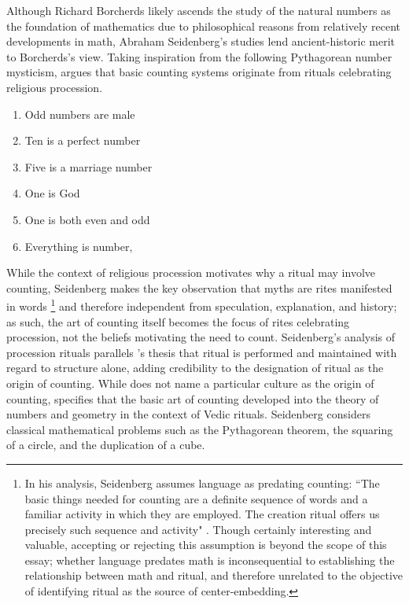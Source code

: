 \documentclass[12pt, letterpaper]{article}
\begin{document}
Although Richard Borcherds likely ascends the study of the natural numbers as the foundation of mathematics due to philosophical reasons from relatively recent developments in math, Abraham Seidenberg's studies lend ancient-historic merit to Borcherds's view. 
Taking inspiration from the following Pythagorean number mysticism, \cite{seidenberg1962counting} argues that basic counting systems originate from rituals celebrating religious procession. 
\begin{enumerate}
  \centering
  \item Odd numbers are male 
  \item Ten is a perfect number 
  \item Five is a marriage number 
  \item One is God 
  \item One is both even and odd 
  \item Everything is number,
\end{enumerate}
While the context of religious procession motivates why a ritual may involve counting, Seidenberg makes the key observation that myths are rites manifested in words
\footnote{In his analysis, Seidenberg assumes language as predating counting: 
``The basic things needed for counting are a definite sequence of words and a familiar activity in which they are employed. 
The creation ritual offers us precisely such sequence and activity" \parencite[p. 8]{seidenberg1962counting}.
Though certainly interesting and valuable, accepting or rejecting this assumption is beyond the scope of this essay; 
whether language predates math is inconsequential to establishing the relationship between math and ritual, and therefore unrelated to the objective of identifying ritual as the source of center-embedding.} \label{ft:lang_pred_math}
and therefore independent from speculation, explanation, and history;
as such, the art of counting itself becomes the focus of rites celebrating procession, not the beliefs motivating the need to count.
Seidenberg's analysis of procession rituals parallels \cite{staal1984search}'s thesis that ritual is performed and maintained with regard to structure alone, adding credibility to the designation of ritual as the origin of counting.  
While \cite{seidenberg1962counting} does not name a particular culture as the origin of counting, \cite{seidenberg1961geometry} specifies that the basic art of counting developed into the theory of numbers and geometry in the context of Vedic rituals. 
Seidenberg considers classical mathematical problems such as the Pythagorean theorem, the squaring of a circle, and the duplication of a cube.
\end{document}
